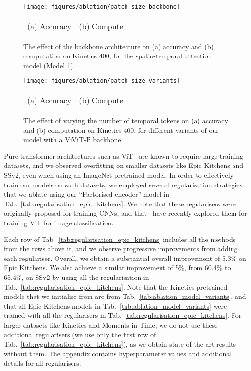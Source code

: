 \documentclass[10pt,twocolumn,letterpaper]{article}
\makeatletter
\renewcommand{\paragraph}{\@startsection{paragraph}{4}{\z@}{1.625ex \@plus 1ex \@minus .2ex}{-1em}{\normalfont\normalsize\bfseries}}
\makeatother
\begin{document}
 
\begin{figure}[t]
	\centering
	\texttt{[image: figures/ablation/patch\_size\_backbone]}
	\footnotesize{
    	\begin{tabularx}{\linewidth}{YY}
    	    (a) Accuracy   &  (b) Compute
    	\end{tabularx}
	}
	\caption{The effect of the backbone architecture on (a) accuracy and (b) computation on Kinetics 400, for the spatio-temporal attention model (Model 1).
	}
	\label{fig:ablation_backbone}
	\vspace{-0.5\baselineskip}
\end{figure} 
\begin{figure}[t]
	\centering
	\texttt{[image: figures/ablation/patch\_size\_variants]}
	\\
	\footnotesize{
    	\begin{tabularx}{\linewidth}{YY}
    	    (a) Accuracy   &  (b) Compute
    	\end{tabularx}
	}
 	\vspace{-0.5\baselineskip}
	\caption{The effect of varying the number of temporal tokens on (a) accuracy and (b) computation on Kinetics 400, for different variants of our model with a ViViT-B backbone.
	}
	\label{fig:ablation_temporal_tokens}
	\vspace{-\baselineskip}
\end{figure}
 
\paragraph{Model regularisation}
Pure-transformer architectures such as ViT~\cite{dosovitskiy_iclr_2021} are known to require large training datasets, and we observed overfitting on smaller datasets like Epic Kitchens and SSv2, even when using an ImageNet pretrained model.
In order to effectively train our models on such datasets, we employed several regularisation strategies that we ablate using our ``Factorised encoder'' model in Tab.~\ref{tab:regularisation_epic_kitchens}.
We note that these regularisers were originally proposed for training CNNs, and that~\cite{touvron_arxiv_2020} have recently explored them for training ViT for image classification.

Each row of Tab.~\ref{tab:regularisation_epic_kitchens} includes all the methods from the rows above it, and we observe progressive improvements from adding each regulariser.
Overall, we obtain a substantial overall improvement of 5.3\% on Epic Kitchens. We also achieve a similar improvement of 5\%, from 60.4\% to 65.4\%, on SSv2 by using all the regularisation in Tab.~\ref{tab:regularisation_epic_kitchens}.
Note that the Kinetics-pretrained models that we initialise from are from Tab.~\ref{tab:ablation_model_variants}, and that all Epic Kitchens models in Tab.~\ref{tab:ablation_model_variants} were trained with all the regularisers in Tab.~\ref{tab:regularisation_epic_kitchens}.
For larger datasets like Kinetics and Moments in Time, we do not use these additional regularisers (we use only the first row of Tab.~\ref{tab:regularisation_epic_kitchens}), as we obtain state-of-the-art results without them.
The appendix contains hyperparameter values and additional details for all regularisers.
\end{document}
